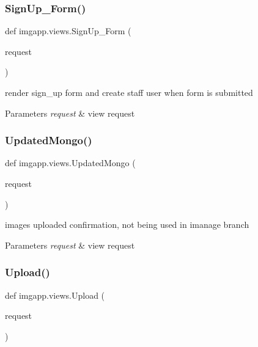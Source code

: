 \subsubsection{\texorpdfstring{Sign\+Up\+\_\+\+Form()}{SignUp\_Form()}}
{\footnotesize\ttfamily def imgapp.\+views.\+Sign\+Up\+\_\+\+Form (\begin{DoxyParamCaption}\item[{}]{request }\end{DoxyParamCaption})}



render sign\+\_\+up form and create staff user when form is submitted 


\begin{DoxyParams}{Parameters}
{\em request} & view request \\
\hline
\end{DoxyParams}
\mbox{\label{namespaceimgapp_1_1views_a3e7e98b43ec1f6f0205f62d1ddcc505b}} 
\subsubsection{\texorpdfstring{Updated\+Mongo()}{UpdatedMongo()}}
{\footnotesize\ttfamily def imgapp.\+views.\+Updated\+Mongo (\begin{DoxyParamCaption}\item[{}]{request }\end{DoxyParamCaption})}



images uploaded confirmation, not being used in imanage branch 


\begin{DoxyParams}{Parameters}
{\em request} & view request \\
\hline
\end{DoxyParams}
\mbox{\label{namespaceimgapp_1_1views_a30bd5c7a24785551afd3da58fa259a6b}} 
\subsubsection{\texorpdfstring{Upload()}{Upload()}}
{\footnotesize\ttfamily def imgapp.\+views.\+Upload (\begin{DoxyParamCaption}\item[{}]{request }\end{DoxyParamCaption})}



